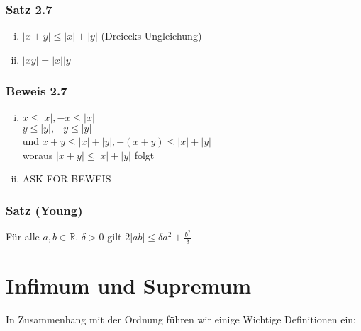 \begin{enumerate}
\subsubsection*{Satz 2.7}
\begin{enumerate}[i)]
\item $\left| {x + y} \right| \le \left| x \right| + \left| y \right|$ (Dreiecks Ungleichung)
\item $\left| {xy} \right| = \left| x \right|\left| y \right|$
\end{enumerate}
\subsubsection*{Beweis 2.7}
\begin{enumerate}[i)]
\item $x \le \left| x \right|, - x \le \left| x \right|$\\$y \le \left| y \right|, - y \le \left| y \right|$\\und $x+y\leq  \left| x \right| +  \left| y \right|, - (x + y) \le \left| x \right| + \left| y \right|$ \\ woraus $\left| {x + y} \right| \le \left| x \right| + \left| y \right|$ folgt
\item ASK FOR BEWEIS
\end{enumerate}

\subsubsection*{Satz (Young)}
Für alle $a,b\in\mathbb{R}$. $\delta >0$ gilt $2\left| {ab} \right| \le \delta {a^2} + \frac{{{b^2}}}{\delta }$
\end{enumerate}

\section{Infimum und Supremum}
In Zusammenhang mit der Ordnung führen wir einige Wichtige Definitionen ein:

